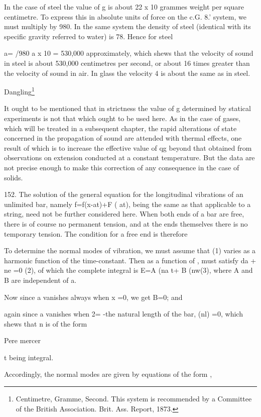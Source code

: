 In the case of steel the value of g is about 22 x 10 grammes weight per
square centimetre. To express this in absolute units of force on the
c.G. 8.' system, we must multiply by 980. In the same system the density
of steel (identical with its specific gravity referred to water) is 78.
Hence for steel

a= /980 a x 10 = 530,000
approximately, which shews that the velocity of sound in steel is about
530,000 centimetres per second, or about 16 times greater than the
velocity of sound in air. In glass the velocity 4 is about the same as
in steel.

Dangling\footnote{ Centimetre, Gramme, Second. This system is recommended by a Committee
of the British Association. Brit. Ass. Report, 1873.}

It ought to be mentioned that in strictness the value of g determined by
statical experiments is not that which ought to be used here. As in the
case of gases, which will be treated in a subsequent chapter, the rapid
alterations of state concerned in the propagation of sound are attended
with thermal effects, one result of which is to increase the effective
value of qg beyond that obtained from observations on extension
conducted at a constant temperature. But the data are not precise enough
to make this correction of any consequence in the case of solids.

152. The solution of the general equation for the longitudinal
vibrations of an unlimited bar, namely f=f(x-at)+F ( at), being the same
as that applicable to a string, need not be further considered here.
When both ends of a bar are free, there is of course no permanent
tension, and at the ends themselves there is no temporary tension. The
condition for a free end is therefore

To determine the normal modes of vibration, we must assume that
(1) varies as a harmonic function of the time-constant. Then as a function of
, must satisfy da + ne =0 (2),
of which the complete integral is E=A (na t+ B (nw(3), where A and
B are independent of a.

Now since a vanishes always when x =0, we get B=0; and

again since a vanishes when 2= -the natural length of the bar,
(nl) =0, which shews that n is of the form

Pere mercer

t being integral.


Accordingly, the normal modes are given by equations of the form ,

